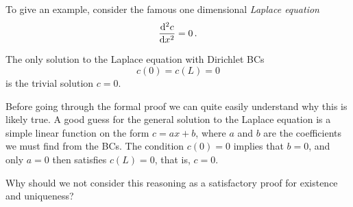 To give an example, consider the famous one dimensional \emph{Laplace equation} 
\begin{equation}
  \label{eq:laplace}
  \frac{\mathrm{d}^2 c}{\mathrm{d} x^2} =  0 \, . 
\end{equation}
 
\begin{theorem}
  The only solution to the Laplace equation with Dirichlet BCs
  \begin{equation}
    c(0) = c(L)=0
  \end{equation}
  is the trivial solution $c=0$.
\end{theorem}
Before going through the formal proof we can quite easily understand why
this is likely true. A good guess for the general solution to the Laplace equation is a
simple linear function on the form $c = ax + b$, where $a$ and $b$
are the coefficients we must find from the BCs. The condition $c(0) = 0$ implies that $b=0$,
and only $a=0$ then satisfies $c(L) = 0$, that is, $c=0$.

\begin{question}
	Why should we not consider this reasoning as a satisfactory proof for existence and uniqueness?
\end{question}

